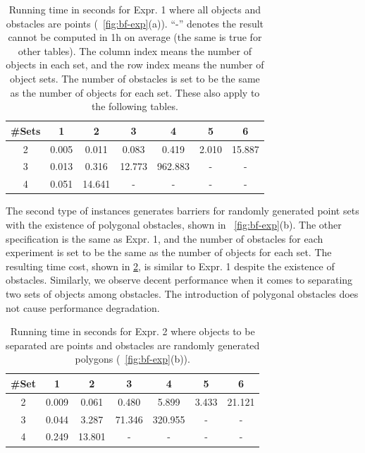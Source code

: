 \begin{table}[ht]
    \centering
    \begin{tabular}{|c|c|c|c|c|c|c|}\hline
        \#Sets &  1 & 2 & 3 & 4& 5& 6\\\hline
    2& 0.005 & 0.011 & 0.083 & 0.419 & 2.010 & 15.887 \\\hline
    3& 0.013 & 0.316 & 12.773 & 962.883 & - & - \\\hline
    4& 0.051 & 14.641 &  -& - &  -&- \\\hline
    \end{tabular}
    \caption[Running time in seconds for Expr. 1]{Running time in seconds for Expr. 1 where all objects and obstacles are points (~\ref{fig:bf-exp}(a)). ``-'' denotes the result cannot be computed in 1h on average (the same is true for other tables). 
    The column index means the number of objects in each set, and the row index means the number of object sets.
    The number of obstacles is set to be the same as the number of objects for each set. These also apply to the following tables.
    }
    \label{tab:bf-expr_1}
\end{table}

 The second type of instances generates barriers for randomly generated 
 point sets with the existence of polygonal obstacles, shown in ~\ref{fig:bf-exp}(b). 
 The other specification is the same as Expr. 1, and the number of obstacles for each experiment is set to be the same as the number of objects for each set. 
 The resulting time cost, shown in \ref{tab:bf-expr_2}, is similar to Expr. 1 despite the existence of obstacles.
 Similarly, we observe decent performance when it comes to separating two sets of objects among obstacles. 
 The introduction of polygonal obstacles does not cause performance degradation. 


\begin{table}[ht]
    \centering
    \begin{tabular}{|c|c|c|c|c|c|c|}\hline
        \#Set &  1 & 2 & 3 & 4& 5& 6\\\hline
2& 0.009 & 0.061 & 0.480 & 5.899 & 3.433 & 21.121\\\hline
 3& 0.044 & 3.287 & 71.346 & 320.955 & - & -\\\hline
 4& 0.249 & 13.801 & - & - & - & -\\\hline
    \end{tabular}
    \caption[Running time in seconds for Expr. 2]{Running time in seconds for Expr. 2 where objects to be separated are points and obstacles are randomly generated polygons (~\ref{fig:bf-exp}(b)). 
    }
    \label{tab:bf-expr_2}
    \vspace{-2mm}
\end{table}
 
